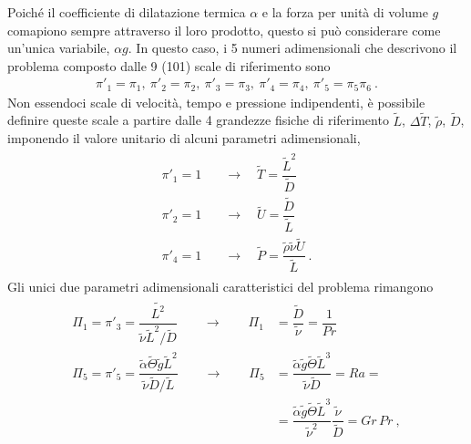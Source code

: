 \documentclass[letterpaper,10pt,italian]{jupyterBook}
\begin{document}
\sphinxAtStartPar
Poiché il coefficiente di dilatazione termica \(\alpha\) e
la forza per unità di volume \(g\) comapiono sempre attraverso il loro
prodotto, questo si può considerare come un’unica variabile, \(\alpha g\).
In questo caso, i 5 numeri adimensionali che descrivono il problema
composto dalle 9 (10\sphinxhyphen{}1) scale di riferimento sono
\begin{equation*}
\begin{split}\pi'_1 = \pi_1, \  \pi'_2 = \pi_2, \ \pi'_3 = \pi_3, \ \pi'_4 = \pi_4, \ \pi'_5 = \pi_5 \pi_6 \ .\end{split}
\end{equation*}
\sphinxAtStartPar
Non essendoci scale di velocità, tempo e pressione indipendenti, è
possibile definire queste scale a partire dalle 4 grandezze fisiche di
riferimento \(\tilde{L}\), \(\Delta \tilde{T}\), \(\tilde{\rho}\),
\(\tilde{D}\), imponendo il valore unitario di alcuni parametri
adimensionali,
\begin{equation*}
\begin{split}\begin{aligned}
      \pi'_1 = 1 & \quad \rightarrow \quad \tilde{T} = \dfrac{\tilde{L}^2}{\tilde{D}} \\
      \pi'_2 = 1 & \quad \rightarrow \quad \tilde{U} = \dfrac{\tilde{D}}{\tilde{L}} \\
      \pi'_4 = 1 & \quad \rightarrow \quad \tilde{P} = \dfrac{\tilde{\rho}\tilde{\nu}\tilde{U}}{\tilde{L}} \ .
    \end{aligned}\end{split}
\end{equation*}
\sphinxAtStartPar
Gli unici due parametri adimensionali caratteristici
del problema rimangono
\begin{equation*}
\begin{split}\begin{aligned}
 \Pi_1 = \pi'_3 = \dfrac{\tilde{L^2}}{\tilde{\nu} \tilde{L}^2/\tilde{D}} \qquad \rightarrow \qquad \Pi_1  & = \dfrac{\tilde{D}}{\tilde{\nu}} = \dfrac{1}{Pr} \\
 \Pi_5 = \pi'_5 = \dfrac{\tilde{\alpha}\tilde{\Theta} \tilde{g} \tilde{L}^2}{\tilde{\nu} \tilde{D}/\tilde{L}} \qquad \rightarrow \qquad \Pi_5 & = \dfrac{\tilde{\alpha}\tilde{g}\tilde{\Theta}  \tilde{L}^3}{\tilde{\nu} \tilde{D}} = Ra = \\
 & = \dfrac{\tilde{\alpha}\tilde{g}\tilde{\Theta}  \tilde{L}^3}{\tilde{\nu}^2}\dfrac{\tilde{\nu}}{\tilde{D}} = Gr \, Pr \ ,
\end{aligned}\end{split}
\end{equation*}
\end{document}
